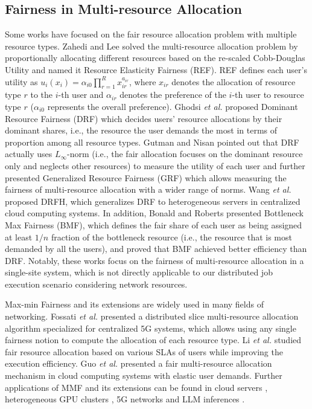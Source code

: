 \subsection{Fairness in Multi-resource Allocation}
Some works have focused on the fair resource allocation problem with multiple resource types. Zahedi and Lee \cite{REF} solved the multi-resource allocation problem by proportionally allocating different resources based on the re-scaled Cobb-Douglas Utility and named it Resource Elasticity Fairness (REF). REF defines each user's utility as $u_i(x_i) = \alpha_{i0} \prod_{r=1}^Rx_{ir}^{a_{ir}}$, where $x_{ir}$ denotes the allocation of resource type $r$ to the $i$-th user and $\alpha_{ir}$ denotes the preference of the $i$-th user to resource type $r$ ($\alpha_{i0}$ represents the overall preference). Ghodsi \textit{et al.} \cite{DRF} proposed Dominant Resource Fairness (DRF) which decides users' resource allocations by their dominant shares, i.e., the resource the user demands the most in terms of proportion among all resource types. Gutman and Nisan \cite{gutman2012GDF} pointed out that DRF actually uses $L_{\infty}$-norm (i.e., the fair allocation focuses on the dominant resource only and neglects other resources) to measure the utility of each user and further presented Generalized Resource Fairness (GRF) which allows measuring the fairness of multi-resource allocation with a wider range of norms. Wang \textit{et al.} \cite{wang2014dominant} proposed DRFH, which generalizes DRF to heterogeneous servers in centralized cloud computing systems. In addition, Bonald and Roberts \cite{bonald2015multi} presented Bottleneck Max Fairness (BMF), which defines the fair share of each user as being assigned at least $1/n$ fraction of the bottleneck resource (i.e., the resource that is most demanded by all the users), and proved that BMF achieved better efficiency than DRF. Notably, these works focus on the fairness of multi-resource allocation in a single-site system, which is not directly applicable to our distributed job execution scenario considering network resources. 

Max-min Fairness and its extensions are widely used in many fields of networking. Fossati \textit{et al.} \cite{fossati2022distributed} presented a distributed slice multi-resource allocation algorithm specialized for centralized 5G systems, which allows using any single fairness notion to compute the allocation of each resource type. Li \textit{et al.} \cite{li2025fair} studied fair resource allocation based on various SLAs of users while improving the execution efficiency. Guo \textit{et al.} \cite{guo2024dynamic} presented a fair multi-resource allocation mechanism in cloud computing systems with elastic user demands. Further applications of MMF and its extensions can be found in cloud servers \cite{wang2014dominant}, heterogeneous GPU clusters \cite{mahajan2020themis}, 5G networks \cite{fossati2020multi} and LLM inferences \cite{sheng2024fairness}.

